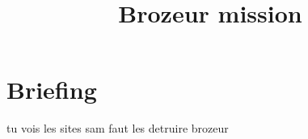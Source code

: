 \documentclass{article}
\title{Brozeur mission}
\begin{document}
                    \maketitle

                    \section{Briefing}
                    tu vois les sites sam faut les detruire brozeur

                    
\end{document}
